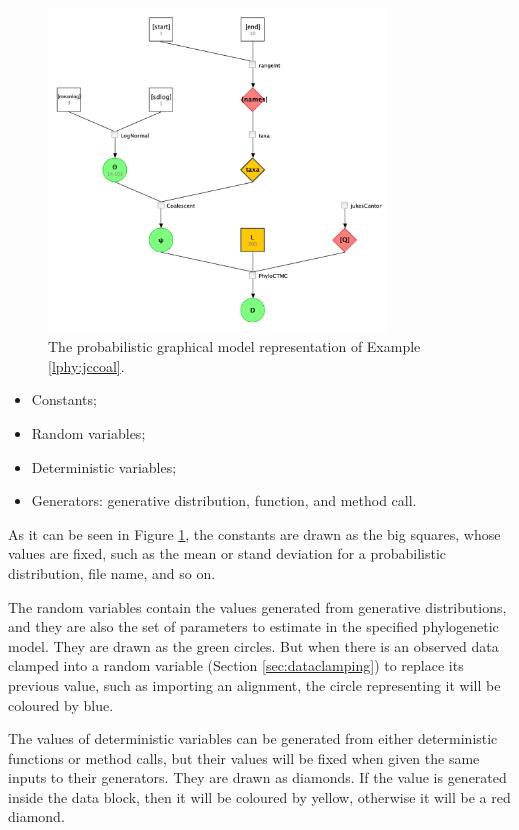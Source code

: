 \documentclass[10pt,letterpaper,table]{article}
\begin{document}
\begin{figure}
  \includegraphics[width=0.8\textwidth]{figs/jc_coal.png}
  \caption{The probabilistic graphical model representation of Example \ref{lphy:jccoal}.} 
  \label{fig:jccoalPGM}
\end{figure}

\begin{itemize}
    \item Constants;
    \item Random variables;
    \item Deterministic variables;
    \item Generators: generative distribution, function, and method call.
\end{itemize}

As it can be seen in Figure \ref{fig:jccoalPGM}, the constants are drawn as the big squares, whose values are fixed, such as the mean or stand deviation for a probabilistic distribution, file name, and so on. 

The random variables contain the values generated from generative distributions, and they are also the set of parameters to estimate in the specified phylogenetic model. They are drawn as the green circles. 
But when there is an observed data clamped into a random variable (Section \ref{sec:dataclamping}) to replace its previous value, such as importing an alignment, the circle representing it will be coloured by blue.

The values of deterministic variables can be generated from either deterministic functions or method calls, but their values will be fixed when given the same inputs to their generators. They are drawn as diamonds. If the value is generated inside the data block, then it will be coloured by yellow, otherwise it will be a red diamond.
\end{document}
